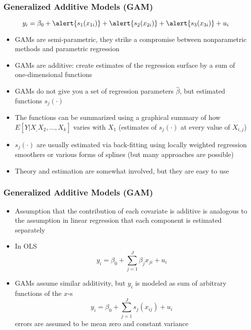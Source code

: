 \documentclass{beamer}
\numberwithin{equation}{section}
\begin{document}
 \begin{frame}[fragile]
\frametitle{Generalized Additive Models (GAM)}
\small
$$
y_i = \beta_0 + \alert{s_1(x_{1i})} + \alert{s_2(x_{2i})} + \alert{s_3(x_{3i})} + u_i
$$
\begin{itemize}
  \item GAMs are semi-parametric, they strike a compromise between nonparametric methods and parametric regression 
  \item GAMs are additive: create estimates of the regression surface by a sum of one-dimensional functions
  \item GAMs do not give you a set of regression parameters $\hat{\beta}$, but estimated functions $s_j(\cdot)$ 
    \item The functions can be summarized using a graphical summary of how $E[Y|X_,X_2,...,X_k]$ varies with $X_1$ (estimates of $s_j(\cdot)$ at every value of $X_{i,j}$)
  \item $s_j(\cdot)$ are usually estimated via back-fitting using locally weighted regression smoothers or various forms of splines (but many approaches are possible)
 \item Theory and estimation are somewhat involved, but they are easy to use
\end{itemize}
\end{frame}


 \begin{frame}[fragile]
\frametitle{Generalized Additive Models (GAM)}
\small
\begin{itemize}
  \item Assumption that the contribution of each covariate is additive is analogous to the assumption in linear regression that each component is estimated separately
\item In OLS
$$
y_i = \beta_0 + \sum_{j=1}^J  \beta_j   x_{ji} + u_i
$$  
  
  \item GAMs assume similar additivity, but  $y_i$ is modeled as sum of arbitrary functions of the $x$-s
  $$
  y_i = \beta_0 + \sum_{j=1}^J   s_j(x_{ij}) + u_i
  $$
errors are  assumed to be mean zero and constant variance
\end{itemize}
\end{frame}
\end{document}
